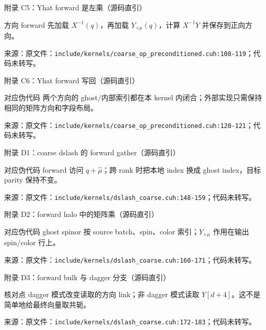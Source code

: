 \documentclass[UTF8,aspectratio=169,11pt]{ctexbeamer}
\newcommand{\source}[1]{\vspace{0.05em}\par{\raggedright\scriptsize\color{muted}来源：#1\par}}
\newcommand{\codepath}[1]{\nolinkurl{#1}}
\begin{document}
\begin{frame}[fragile,t]{附录 C5：Yhat forward 是左乘（源码直引）}
  
  \begin{alertblock}{方向}
    forward 先加载 \(X^{-1}(q)\)，再加载 \(Y_{+\mu}(q)\)，计算 \(X^{-1}Y\) 并保存到正向方向。
  \end{alertblock}
  \source{原文件：\codepath{include/kernels/coarse_op_preconditioned.cuh:108-119}；代码未转写。}
\end{frame}

\begin{frame}[fragile,t]{附录 C6：Yhat forward 写回（源码直引）}
  
  \begin{block}{对应伪代码}
    两个方向的 ghost/内部索引都在本 kernel 内闭合；外部实现只需保持相同的矩阵方向和字段布局。
  \end{block}
  \source{原文件：\codepath{include/kernels/coarse_op_preconditioned.cuh:120-121}；代码未转写。}
\end{frame}

\begin{frame}[fragile,t]{附录 D1：coarse dslash 的 forward gather（源码直引）}
  
  \begin{block}{对应伪代码}
    forward 访问 \(q+\hat\mu\)；跨 rank 时把本地 index 换成 ghost index，目标 parity 保持不变。
  \end{block}
  \source{原文件：\codepath{include/kernels/dslash_coarse.cuh:148-159}；代码未转写。}
\end{frame}

\begin{frame}[fragile,t]{附录 D2：forward halo 中的矩阵乘（源码直引）}
  
  \begin{block}{对应伪代码}
    ghost spinor 按 source batch、spin、color 索引；\(Y_{+\mu}\) 作用在输出 spin/color 行上。
  \end{block}
  \source{原文件：\codepath{include/kernels/dslash_coarse.cuh:160-171}；代码未转写。}
\end{frame}

\begin{frame}[fragile,t]{附录 D3：forward bulk 与 dagger 分支（源码直引）}
  
  \begin{alertblock}{核对点}
    dagger 模式改变读取的方向 link；非 dagger 模式读取 \(Y[d+4]\)。这不是简单地给最终向量取共轭。
  \end{alertblock}
  \source{原文件：\codepath{include/kernels/dslash_coarse.cuh:172-183}；代码未转写。}
\end{frame}
\end{document}
